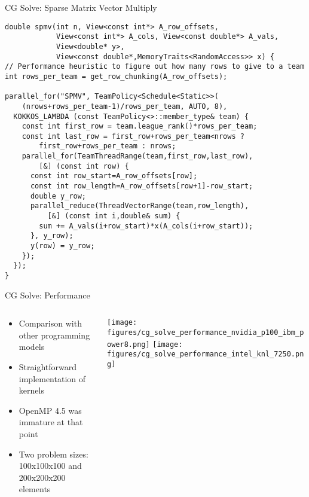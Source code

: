 \begin{frame}[fragile]{CG Solve: Sparse Matrix Vector Multiply}
\begin{lstlisting}[basicstyle=\tiny]
double spmv(int n, View<const int*> A_row_offsets,
            View<const int*> A_cols, View<const double*> A_vals,
            View<double* y>,
            View<const double*,MemoryTraits<RandomAccess>> x) {
// Performance heuristic to figure out how many rows to give to a team
int rows_per_team = get_row_chunking(A_row_offsets);

parallel_for("SPMV", TeamPolicy<Schedule<Static>>(
    (nrows+rows_per_team-1)/rows_per_team, AUTO, 8),
  KOKKOS_LAMBDA (const TeamPolicy<>::member_type& team) {
    const int first_row = team.league_rank()*rows_per_team;
    const int last_row = first_row+rows_per_team<nrows ?
        first_row+rows_per_team : nrows;
    parallel_for(TeamThreadRange(team,first_row,last_row),
        [&] (const int row) {
      const int row_start=A_row_offsets[row];
      const int row_length=A_row_offsets[row+1]-row_start;
      double y_row;
      parallel_reduce(ThreadVectorRange(team,row_length),
          [&] (const int i,double& sum) {
        sum += A_vals(i+row_start)*x(A_cols(i+row_start));
      }, y_row);
      y(row) = y_row;
    });
  });
}
\end{lstlisting}
\end{frame}

\begin{frame}{CG Solve: Performance}
\begin{columns}[t,onlytextwidth]
  \begin{column}{0.45\textwidth}
    \begin{itemize}
      \small
      \itemsep 0pt
      \parskip 0pt
      \item Comparison with other programming models
      \item Straightforward implementation of kernels
      \item OpenMP 4.5 was immature at that point
      \item Two problem sizes: 100x100x100 and 200x200x200 elements
    \end{itemize}
  \end{column}
  \begin{column}{0.55\textwidth}
    \texttt{[image: figures/cg\_solve\_performance\_nvidia\_p100\_ibm\_power8.png]}
    \texttt{[image: figures/cg\_solve\_performance\_intel\_knl\_7250.png]}
  \end{column}
\end{columns}
\end{frame}
